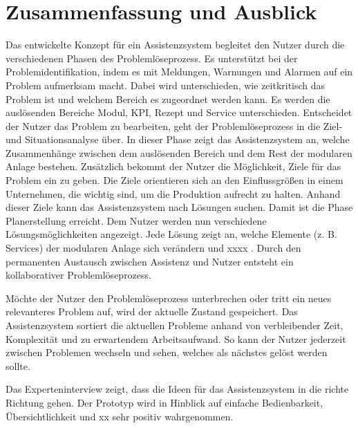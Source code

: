 \chapter{Zusammenfassung und Ausblick}
\label{Zusammenfassung}
Das entwickelte Konzept für ein Assistenzsystem begleitet den Nutzer durch die verschiedenen Phasen des Problemlöseprozess. Es unterstützt bei der Problemidentifikation, indem es mit Meldungen, Warnungen und Alarmen auf ein Problem aufmerksam macht. Dabei wird unterschieden, wie zeitkritisch das Problem ist und welchem Bereich es zugeordnet werden kann. Es werden die auslösenden Bereiche Modul, KPI, Rezept und Service unterschieden. Entscheidet der Nutzer das Problem zu bearbeiten, geht der Problemlöseprozess in die Ziel- und Situationsanalyse über. In dieser Phase zeigt das Assistenzsystem an, welche Zusammenhänge zwischen dem auslösenden Bereich und dem Rest der modularen Anlage bestehen. Zusätzlich bekommt der Nutzer die Möglichkeit, Ziele für das Problem ein zu geben. Die Ziele orientieren sich an den Einflussgrößen in einem Unternehmen, die wichtig sind, um die Produktion aufrecht zu halten. Anhand dieser Ziele kann das Assistenzsystem nach Lösungen suchen. Damit ist die Phase Planerstellung erreicht. Dem Nutzer werden nun verschiedene Lösungsmöglichkeiten angezeigt. Jede Lösung zeigt an, welche Elemente (z. B. Services) der modularen Anlage sich verändern und xxxx . Durch den permanenten Austausch zwischen Assistenz und Nutzer entsteht ein kollaborativer Problemlöseprozess.

Möchte der Nutzer den Problemlöseprozess unterbrechen oder tritt ein neues relevanteres Problem auf, wird der aktuelle Zustand gespeichert. Das Assistenzsystem sortiert die aktuellen Probleme anhand von verbleibender Zeit, Komplexität und zu erwartendem Arbeitsaufwand. So kann der Nutzer jederzeit zwischen Problemen wechseln und sehen, welches als nächstes gelöst werden sollte.

Das Experteninterview zeigt, dass die Ideen für das Assistenzsystem in die richte Richtung gehen. Der Prototyp wird in Hinblick auf einfache Bedienbarkeit, Übersichtlichkeit und xx sehr positiv wahrgenommen. 

